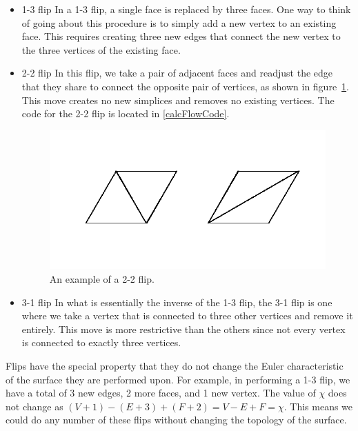 \documentclass[12pt]{article}
\begin{document}
\begin{itemize}
\item 1-3 flip \newline
In a 1-3 flip, a single face is replaced by three faces. One way to think of going about this procedure is to simply add a new vertex to an existing face. This requires creating three new edges that connect the new vertex to the three vertices of the existing face.
\item 2-2 flip \newline
In this flip, we take a pair of adjacent faces and readjust the edge that they share to connect the opposite pair of vertices, as shown in figure~\ref{fig:flip}. This move creates no new simplices and removes no existing vertices. The code for the 2-2 flip is located in \ref{calcFlowCode}.


\begin{figure}
\centering
\includegraphics[scale = 0.8]{Flip.png}
\caption{An example of a 2-2 flip.}
\label{fig:flip}
\end{figure}

\item 3-1 flip \newline
In what is essentially the inverse of the 1-3 flip, the 3-1 flip is one where we take a vertex that is connected to three other vertices and remove it entirely. This move is more restrictive than the others since not every vertex is connected to exactly three vertices. 
\end{itemize}
Flips have the special property that they do not change the Euler characteristic of the surface they are performed upon. For example, in performing a 1-3 flip, we have a total of 3 new edges, 2 more faces, and 1 new vertex. The value of $\chi$ does not change as $(V+1) - (E+3) + (F+2) = V - E + F = \chi$. This means we could do any number of these flips without changing the topology of the surface. \newline
\end{document}
